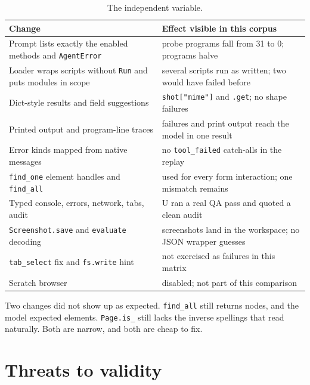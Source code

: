 \documentclass[11pt]{article}
\newcommand{\code}[1]{\texttt{#1}}
\begin{document}
\begin{table}[h]
\centering
\small
\begin{tabular}{@{}p{}p{}@{}}
\toprule
Change & Effect visible in this corpus \\
\midrule
Prompt lists exactly the enabled methods and \code{AgentError} & probe programs fall from 31 to 0; programs halve \\
Loader wraps scripts without \code{Run} and puts modules in scope & several scripts run as written; two would have failed before \\
Dict-style results and field suggestions & \code{shot["mime"]} and \code{.get}; no shape failures \\
Printed output and program-line traces & failures and print output reach the model in one result \\
Error kinds mapped from native messages & no \code{tool\_failed} catch-alls in the replay \\
\code{find\_one} element handles and \code{find\_all} & used for every form interaction; one mismatch remains \\
Typed console, errors, network, tabs, audit & U ran a real QA pass and quoted a clean audit \\
\code{Screenshot.save} and \code{evaluate} decoding & screenshots land in the workspace; no JSON wrapper guesses \\
\code{tab\_select} fix and \code{fs.write} hint & not exercised as failures in this matrix \\
Scratch browser & disabled; not part of this comparison \\
\bottomrule
\end{tabular}
\caption{The independent variable.}
\end{table}

Two changes did not show up as expected. \code{find\_all} still returns nodes,
and the model expected elements. \code{Page.is\_} still lacks the inverse
spellings that read naturally. Both are narrow, and both are cheap to fix.

\section{Threats to validity}
\end{document}
